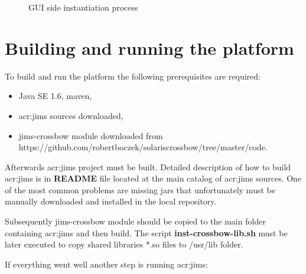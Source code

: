 \documentclass[11pt]{book}
\begin{document}
\begin{figure}[H]

            \caption{GUI side instantiation process}
          \end{figure}
		


    \section{Building and running the platform}
		\label{sec:impl:build}

      To build and run the platform the following prerequisites are required:

      \begin{itemize}
        \item Java SE 1.6, maven,
        \item \gls{acr:jims} sources downloaded,
        \item jims-crossbow module downloaded from \\ https://github.com/robertboczek/solaris\-crossbow/tree/master/code.
      \end{itemize}

      Afterwards \gls{acr:jims} project must be built. Detailed description of how to build \gls{acr:jims} is in \textbf{README} file
      located at the main catalog of \gls{acr:jims} sources. One of the most common problems are missing jars that unfortunately
      must be manually downloaded and installed in the local repository.

      Subsequently jims-crossbow module should be copied to the main folder containing \gls{acr:jims} and then build. The script
      \textbf{inst-crossbow-lib.sh} must be	later executed to copy shared libraries *.so files to /usr/lib folder.

      If everything went well another step is running \gls{acr:jims}:
\end{document}
